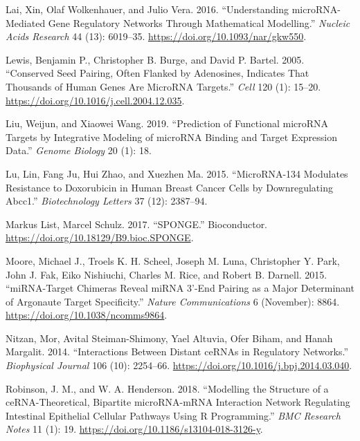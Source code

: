 \documentclass[a4,center,fleqn]{NAR}
\begin{document}
\leavevmode\hypertarget{ref-lai_understanding_2016}{}%
Lai, Xin, Olaf Wolkenhauer, and Julio Vera. 2016. ``Understanding
microRNA-Mediated Gene Regulatory Networks Through Mathematical
Modelling.'' \emph{Nucleic Acids Research} 44 (13): 6019--35.
\url{https://doi.org/10.1093/nar/gkw550}.

\leavevmode\hypertarget{ref-lewis_conserved_2005}{}%
Lewis, Benjamin P., Christopher B. Burge, and David P. Bartel. 2005.
``Conserved Seed Pairing, Often Flanked by Adenosines, Indicates That
Thousands of Human Genes Are MicroRNA Targets.'' \emph{Cell} 120 (1):
15--20. \url{https://doi.org/10.1016/j.cell.2004.12.035}.

\leavevmode\hypertarget{ref-liu2019prediction}{}%
Liu, Weijun, and Xiaowei Wang. 2019. ``Prediction of Functional microRNA
Targets by Integrative Modeling of microRNA Binding and Target
Expression Data.'' \emph{Genome Biology} 20 (1): 18.

\leavevmode\hypertarget{ref-lu2015microrna}{}%
Lu, Lin, Fang Ju, Hui Zhao, and Xuezhen Ma. 2015. ``MicroRNA-134
Modulates Resistance to Doxorubicin in Human Breast Cancer Cells by
Downregulating Abcc1.'' \emph{Biotechnology Letters} 37 (12): 2387--94.

\leavevmode\hypertarget{ref-markus_list_sponge_2017}{}%
Markus List, Marcel Schulz. 2017. ``SPONGE.'' Bioconductor.
\url{https://doi.org/10.18129/B9.bioc.SPONGE}.

\leavevmode\hypertarget{ref-moore_mirnatarget_2015}{}%
Moore, Michael J., Troels K. H. Scheel, Joseph M. Luna, Christopher Y.
Park, John J. Fak, Eiko Nishiuchi, Charles M. Rice, and Robert B.
Darnell. 2015. ``miRNA-Target Chimeras Reveal miRNA 3'-End Pairing as a
Major Determinant of Argonaute Target Specificity.'' \emph{Nature
Communications} 6 (November): 8864.
\url{https://doi.org/10.1038/ncomms9864}.

\leavevmode\hypertarget{ref-nitzan_interactions_2014}{}%
Nitzan, Mor, Avital Steiman-Shimony, Yael Altuvia, Ofer Biham, and Hanah
Margalit. 2014. ``Interactions Between Distant ceRNAs in Regulatory
Networks.'' \emph{Biophysical Journal} 106 (10): 2254--66.
\url{https://doi.org/10.1016/j.bpj.2014.03.040}.

\leavevmode\hypertarget{ref-robinson_modelling_2018}{}%
Robinson, J. M., and W. A. Henderson. 2018. ``Modelling the Structure of
a ceRNA-Theoretical, Bipartite microRNA-mRNA Interaction Network
Regulating Intestinal Epithelial Cellular Pathways Using R
Programming.'' \emph{BMC Research Notes} 11 (1): 19.
\url{https://doi.org/10.1186/s13104-018-3126-y}.
\end{document}
